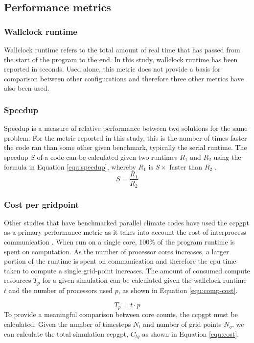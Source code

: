 \documentclass[a4paper,11pt]{report}
\begin{document}
\subsection{Performance metrics}

\subsubsection{Wallclock runtime} 
Wallclock runtime refers to the total amount of real time that has passed from the start of the program to the end. In this study, wallclock runtime has been reported in seconds. Used alone, this metric does not provide a basis for comparison between other configurations and therefore three other metrics have also been used.
	
\subsubsection{Speedup} 
Speedup is a measure of relative performance between two solutions for the same problem. For the metric reported in this study, this is the number of times faster the code ran than some other given benchmark, typically the serial runtime. The speedup $S$ of a code can be calculated given two runtimes $R_1$ and $R_2$ using the formula in Equation \ref{equ:speedup}, whereby $R_1$ is $S\times$ faster than $R_2$ \cite{kumar1994analyzing}.
\begin{equation}
S = \frac{R_1}{R_2} 
\label{equ:speedup}
\end{equation}
	
\subsubsection{Cost per gridpoint}
Other studies that have benchmarked parallel climate codes have used the \gls{ccpgpt} as a primary performance metric as it takes into account the cost of interprocess communication \cite{schmidt2007benchmark}. When run on a single core, 100\% of the program runtime is spent on computation. As the number of processor cores increases, a larger portion of the runtime is spent on communication and therefore the cpu time taken to compute a single grid-point increases. The amount of consumed compute resources $T_p$ for a given simulation can be calculated given the wallclock runtime $t$ and the number of processors used $p$, as shown in Equation \ref{equ:comp-cost}.
\par
\begin{equation}
T_p = t \cdot p
\label{equ:comp-cost}
\end{equation}
To provide a meaningful comparison between core counts, the \gls{ccpgpt} must be calculated. Given the number of timesteps $N_t$ and number of grid points $N_g$, we can calculate the total simulation \gls{ccpgpt}, $C_{tg}$ as shown in Equation \ref{equ:cost}. 
\end{document}
